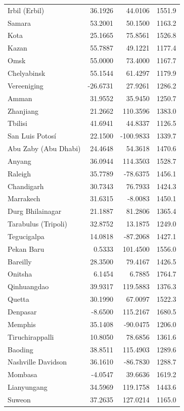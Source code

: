 \begin{longtable}{lrrc}
Irbil (Erbil) & 36.1926 & 44.0106 & 1551.9 \\
Samara & 53.2001 & 50.1500 & 1163.2 \\
Kota & 25.1665 & 75.8561 & 1526.8 \\
Kazan & 55.7887 & 49.1221 & 1177.4 \\
Omsk & 55.0000 & 73.4000 & 1167.7 \\
Chelyabinsk & 55.1544 & 61.4297 & 1179.9 \\
Vereeniging & -26.6731 & 27.9261 & 1286.2 \\
Amman & 31.9552 & 35.9450 & 1250.7 \\
Zhanjiang & 21.2662 & 110.3596 & 1383.0 \\
Tbilisi & 41.6941 & 44.8337 & 1126.5 \\
San Luis Potosí & 22.1500 & -100.9833 & 1339.7 \\
Abu Zaby (Abu Dhabi) & 24.4648 & 54.3618 & 1470.6 \\
Anyang & 36.0944 & 114.3503 & 1528.7 \\
Raleigh & 35.7789 & -78.6375 & 1456.1 \\
Chandigarh & 30.7343 & 76.7933 & 1424.3 \\
Marrakech & 31.6315 & -8.0083 & 1450.1 \\
Durg Bhilainagar & 21.1887 & 81.2806 & 1365.4 \\
Tarabulus (Tripoli) & 32.8752 & 13.1875 & 1249.0 \\
Tegucigalpa & 14.0818 & -87.2068 & 1427.1 \\
Pekan Baru & 0.5333 & 101.4500 & 1556.0 \\
Bareilly & 28.3500 & 79.4167 & 1426.5 \\
Onitsha & 6.1454 & 6.7885 & 1764.7 \\
Qinhuangdao & 39.9317 & 119.5883 & 1376.3 \\
Quetta & 30.1990 & 67.0097 & 1522.3 \\
Denpasar & -8.6500 & 115.2167 & 1680.5 \\
Memphis & 35.1408 & -90.0475 & 1206.0 \\
Tiruchirappalli & 10.8050 & 78.6856 & 1361.6 \\
Baoding & 38.8511 & 115.4903 & 1289.6 \\
Nashville Davidson & 36.1610 & -86.7830 & 1288.7 \\
Mombasa & -4.0547 & 39.6636 & 1619.2 \\
Lianyungang & 34.5969 & 119.1758 & 1443.6 \\
Suweon & 37.2635 & 127.0214 & 1165.0 \\

\end{longtable}
